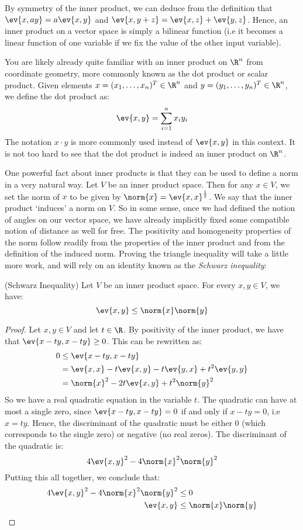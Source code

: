By symmetry of the inner product, we can deduce from the definition that \( \ev{x,ay}=a\ev{x,y} \) and \( \ev{x,y+z}=\ev{x,z}+\ev{y,z} \). Hence, an inner product on a vector space is simply a bilinear function (i.e it becomes a linear function of one variable if we fix the value of the other input variable).

\vspace{3mm}

You are likely already quite familiar with an inner product on \( \R^n \) from coordinate geometry, more commonly known as the dot product or scalar product. Given elements \( x=(x_1,\dots,x_n)^T\in\R^n \) and \( y=(y_1,\dots,y_n)^T\in\R^n \), we define the dot product as:
\[ \ev{x,y}=\sum_{i=1}^nx_iy_i \]
The notation \( x\cdot y \) is more commonly used instead of \( \ev{x,y} \) in this context. It is not too hard to see that the dot product is indeed an inner product on \( \R^n \).

\vspace{3mm}

One powerful fact about inner products is that they can be used to define a norm in a very natural way. Let \( V \) be an inner product space. Then for any \( x\in V \), we set the norm of \( x \) to be given by \( \norm{x}=\ev{x,x}^{\frac{1}{2}} \). We say that the inner product `induces' a norm on \( V \). So in some sense, once we had defined the notion of angles on our vector space, we have already implicitly fixed some compatible notion of distance as well for free. The positivity and homogeneity properties of the norm follow readily from the properties of the inner product and from the definition of the induced norm. Proving the triangle inequality will take a little more work, and will rely on an identity known as the \emph{Schwarz inequality}:

\begin{theorem}
  (Schwarz Inequality) Let \( V \) be an inner product space. For every \( x,y\in V \), we have:
  \[ \ev{x,y}\leq \norm{x}\norm{y} \]
\end{theorem}
\begin{proof}
  Let \( x,y\in V \) and let \( t\in\R \). By positivity of the inner product, we have that \( \ev{x-ty,x-ty}\geq 0 \). This can be rewritten as:
  \begin{align*}
    0&\leq \ev{x-ty,x-ty}\\
    &= \ev{x,x}-t\ev{x,y}-t\ev{y,x}+t^2\ev{y,y}\\
    &= \norm{x}^2-2t\ev{x,y}+t^2\norm{y}^2
  \end{align*}
  So we have a real quadratic equation in the variable \( t \). The quadratic can have at most a single zero, since \( \ev{x-ty,x-ty}=0 \) if and only if \( x-ty=0 \), i.e \( x=ty \). Hence, the discriminant of the quadratic must be either 0 (which corresponds to the single zero) or negative (no real zeros). The discriminant of the quadratic is:
  \[ 4\ev{x,y}^2-4\norm{x}^2\norm{y}^2 \]
  Putting this all together, we conclude that:
  \begin{align*}
    4\ev{x,y}^2-4\norm{x}^2\norm{y}^2&\leq 0\\
    \ev{x,y}&\leq\norm{x}\norm{y}
  \end{align*}
\end{proof}


